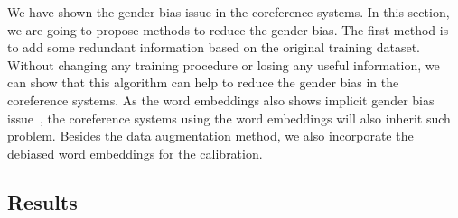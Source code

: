  We have shown the gender bias issue in the coreference systems. In this section, we are going to propose methods to reduce the gender bias.
The first method is  to add some redundant information based on the original training dataset. Without changing any training procedure or losing any useful information, we can show that this algorithm can help to reduce the gender bias in the coreference systems.
As the word embeddings also shows implicit gender bias issue~\cite{BCWS16}, the coreference systems using the word embeddings will also inherit such problem.  Besides the data augmentation method, we also  incorporate the debiased word embeddings for the calibration.








\subsection{Results}

